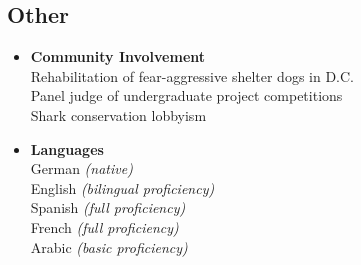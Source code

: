 \documentclass[10pt]{article}
\begin{document}
\begin{flushleft}
\section*{Other}

\begin{itemize}
\item[] \textbf{Community Involvement}\\
Rehabilitation of fear-aggressive shelter dogs in D.C. \\
Panel judge of undergraduate project competitions \\
Shark conservation lobbyism
\end{itemize}

\begin{itemize}
\item[] \textbf{Languages}\\
German \textit{(native)} \\
English \textit{(bilingual proficiency)} \\
Spanish \textit{(full proficiency)} \\
French \textit{(full proficiency)} \\
Arabic \textit{(basic proficiency)} \\
\end{itemize}



\pagestyle{myheadings}

\end{flushleft}
\end{document}
